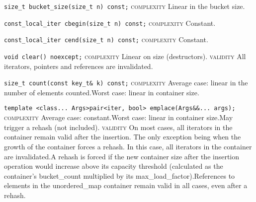 \noindent{}\hspace*{0.25em}\lstinline[basicstyle=\ttfamily\color{corange}]{size_t bucket_size(size_t n) const;} \textsc{complexity} Linear in the bucket size.\\\vspace{-0.6em}

\noindent{}\hspace*{0.25em}\lstinline[basicstyle=\ttfamily\color{cgreen}]{const_local_iter cbegin(size_t n) const;} \textsc{complexity} Constant.\\\vspace{-0.6em}

\noindent{}\hspace*{0.25em}\lstinline[basicstyle=\ttfamily\color{cgreen}]{const_local_iter cend(size_t n) const;} \textsc{complexity} Constant.\\\vspace{-0.6em}

\noindent{}\hspace*{0.25em}\lstinline[basicstyle=\ttfamily\color{corange}]{void clear() noexcept;} \textsc{complexity} Linear on size (destructors). \textsc{validity} All iterators, pointers and references are invalidated.\\\vspace{-0.6em}

\noindent{}\hspace*{0.25em}\lstinline[basicstyle=\ttfamily\color{corange}]{size_t count(const key_t& k) const;} \textsc{complexity} Average case: linear in the number of elements counted.Worst case: linear in container size.\\\vspace{-0.6em}

\noindent{}\hspace*{0.25em}\lstinline[basicstyle=\ttfamily\color{corange}]{template <class... Args>pair<iter, bool> emplace(Args&&... args);} \textsc{complexity} Average case: constant.Worst case: linear in container size.May trigger a rehash (not included). \textsc{validity} On most cases, all iterators in the container remain valid after the insertion. The only exception being when the growth of the container forces a rehash. In this case, all iterators in the container are invalidated.A rehash is forced if the new container size after the insertion operation would increase above its capacity threshold (calculated as the container's bucket\_count multiplied by its max\_load\_factor).References to elements in the unordered\_map container remain valid in all cases, even after a rehash.\\\vspace{-0.6em}

